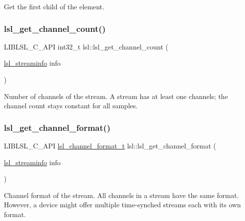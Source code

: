 Get the first child of the element. \mbox{\label{namespacelsl_a40acd87a21d3c91a524bd72012dc3328}} 
\subsubsection{\texorpdfstring{lsl\+\_\+get\+\_\+channel\+\_\+count()}{lsl\_get\_channel\_count()}}
{\footnotesize\ttfamily L\+I\+B\+L\+S\+L\+\_\+\+C\+\_\+\+A\+PI int32\+\_\+t lsl\+::lsl\+\_\+get\+\_\+channel\+\_\+count (\begin{DoxyParamCaption}\item[{\hyperlink{namespacelsl_aa0a9ce9956061679949daa2e35aae2e8}{lsl\+\_\+streaminfo}}]{info }\end{DoxyParamCaption})}

Number of channels of the stream. A stream has at least one channels; the channel count stays constant for all samples. \mbox{\label{namespacelsl_a70c26257a8f3042084140a85a867a300}} 
\subsubsection{\texorpdfstring{lsl\+\_\+get\+\_\+channel\+\_\+format()}{lsl\_get\_channel\_format()}}
{\footnotesize\ttfamily L\+I\+B\+L\+S\+L\+\_\+\+C\+\_\+\+A\+PI \hyperlink{namespacelsl_af188e978739868560b53dbf0ddd58e66}{lsl\+\_\+channel\+\_\+format\+\_\+t} lsl\+::lsl\+\_\+get\+\_\+channel\+\_\+format (\begin{DoxyParamCaption}\item[{\hyperlink{namespacelsl_aa0a9ce9956061679949daa2e35aae2e8}{lsl\+\_\+streaminfo}}]{info }\end{DoxyParamCaption})}

Channel format of the stream. All channels in a stream have the same format. However, a device might offer multiple time-\/synched streams each with its own format. \mbox{\label{namespacelsl_aded8755dc0f65d8219449ef37ba7f6c5}} 
